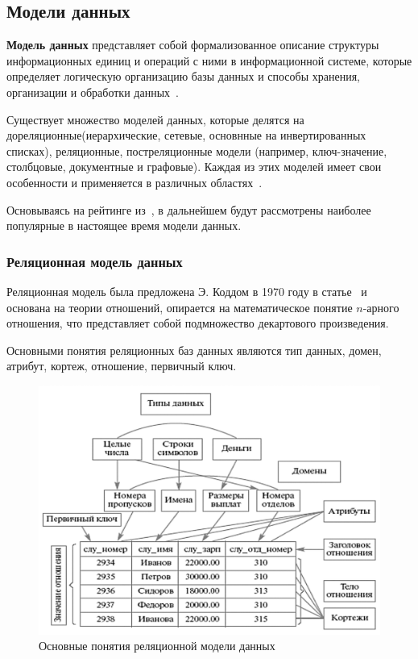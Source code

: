 \subsection{Модели данных}

\textbf{Модель данных} представляет собой формализованное описание структуры информационных единиц и операций с ними в информационной системе, которые определяет логическую организацию базы данных и способы хранения, организации и обработки данных~\cite[с. 4]{Avrunyev2018}.

Существует множество моделей данных, которые делятся на дореляционные(иерархические, сетевые, основнные на инвертированных списках), реляционные, постреляционные модели (например, ключ-значение, столбцовые, документные и графовые). Каждая из этих моделей имеет свои особенности и применяется в различных областях~\cite{Avrunyev2018}.

Основываясь на рейтинге из~\cite{DBEnginesRanking}, в дальнейшем будут рассмотрены наиболее популярные в настоящее время модели данных.

\subsubsection{Реляционная модель данных}

Реляционная модель была предложена Э. Коддом в 1970 году в статье~\cite{Kodd1970} и основана на теории отношений, опирается на математическое понятие $n$-арного отношения, что представляет собой подмножество декартового произведения.

Основными понятия реляционных баз данных являются тип данных, домен, атрибут, кортеж, отношение, первичный ключ.

\begin{figure}[ht!]
	\begin{center}
		\includegraphics[scale=0.7]{./img/rel-model.png}
	\end{center}
	\caption{Основные понятия реляционной модели данных~\cite[c. 31]{Avrunyev2018}}
	\label{fig:rel-model}
\end{figure}


